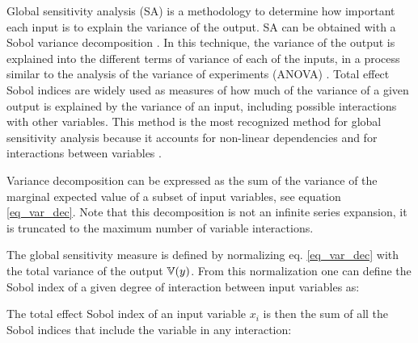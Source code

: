 \documentclass[preprint,12pt]{elsarticle}
\begin{document}
Global sensitivity analysis (SA) is a methodology to determine how important each input is to explain the variance of the output. SA can be obtained with a Sobol variance decomposition \cite{sobol2001global}. In this technique, the variance of the output is explained into the different terms of variance of each of the inputs, in a process similar to the analysis of the variance of experiments (ANOVA) \cite{maxwell2004designing}. Total effect Sobol indices are widely used as measures of how much of the variance of a given output is explained by the variance of an input, including possible interactions with other variables. This method is the most recognized method for global sensitivity analysis because it accounts for non-linear dependencies and for interactions between variables \cite{saltelli2010variance}.

Variance decomposition can be expressed as the sum of the variance of the marginal expected value of a subset of input variables, see equation \ref{eq_var_dec}. Note that this decomposition is not an infinite series expansion, it is truncated to the maximum number of variable interactions.


The global sensitivity measure is defined by normalizing eq. \ref{eq_var_dec} with the total variance of the output $\mathbb{V}(y)$. From this normalization one can define the Sobol index of a given degree of interaction between input variables as:


The total effect Sobol index of an input variable $x_i$ is then the sum of all the Sobol indices that include the variable in any interaction:
\end{document}
